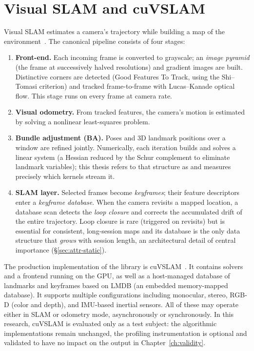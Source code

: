 \section{Visual SLAM and cuVSLAM}\label{sec:bg-slam}

Visual SLAM estimates a camera's trajectory while building a map of the environment~\cite{cadena2016slam,durrant2006slam}. The canonical pipeline consists of four stages:

\begin{enumerate}

\item \textbf{Front-end.} Each incoming frame is converted to grayscale; an \emph{image pyramid} (the frame at successively halved resolutions) and gradient images are built. Distinctive corners are detected (Good Features To Track, using the Shi--Tomasi criterion) and tracked frame-to-frame with Lucas--Kanade optical flow. This stage runs on every frame at camera rate.

\item \textbf{Visual odometry.} From tracked features, the camera's motion is estimated by solving a nonlinear least-squares problem.

\item \textbf{Bundle adjustment (BA).} Poses and 3D landmark positions over a window are refined jointly. Numerically, each iteration builds and solves a linear system (a Hessian reduced by the Schur complement to eliminate landmark variables); this thesis refers to that structure as  and measures precisely which kernels stream it.

\item \textbf{SLAM layer.} Selected frames become \emph{keyframes}; their feature descriptors enter a \emph{keyframe database}. When the camera revisits a mapped location, a database scan detects the \emph{loop closure} and corrects the accumulated drift of the entire trajectory. Loop closure is rare (triggered on revisits) but is essential for consistent, long-session maps and its database is the only data structure that \emph{grows} with session length, an architectural detail of central importance (\S\ref{sec:attr-static}).

\end{enumerate}

The production implementation of the library is cuVSLAM~\cite{cuvslam2025}. It contains solvers and a frontend running on the GPU, as well as a host-managed database of landmarks and keyframes based on LMDB (an embedded memory-mapped database). It supports multiple configurations including monocular, stereo, RGB-D (color and depth), and IMU-based inertial sensors. All of these may operate either in SLAM or odometry mode, asynchronously or synchronously. In this research, cuVSLAM is evaluated only as a test subject: the algorithmic implementations remain unchanged, the profiling instrumentation is optional and validated to have no impact on the output in Chapter~\ref{ch:validity}.


